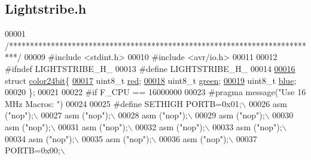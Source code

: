 \hypertarget{_lightstribe_8h_source}{}\subsection{Lightstribe.\+h}

\begin{DoxyCode}
00001 \textcolor{comment}{/**************************************************************************/}
00009 \textcolor{preprocessor}{#include <stdint.h>}
00010 \textcolor{preprocessor}{#include <avr/io.h>}
00011 
00012 \textcolor{preprocessor}{#ifndef LIGHTSTRIBE\_H\_}
00013 \textcolor{preprocessor}{#define LIGHTSTRIBE\_H\_}
00014 
\hypertarget{_lightstribe_8h_source_l00016}{}\hyperlink{structcolor24bit}{00016} \textcolor{keyword}{struct }\hyperlink{structcolor24bit}{color24bit}\{
\hypertarget{_lightstribe_8h_source_l00017}{}\hyperlink{structcolor24bit_ad47d918910aaa51c73160ac85999d09c}{00017}     uint8\_t \hyperlink{structcolor24bit_ad47d918910aaa51c73160ac85999d09c}{red};                                 
\hypertarget{_lightstribe_8h_source_l00018}{}\hyperlink{structcolor24bit_a90d21fa503b626c00cdc8d94863d5877}{00018}     uint8\_t \hyperlink{structcolor24bit_a90d21fa503b626c00cdc8d94863d5877}{green};                                 
\hypertarget{_lightstribe_8h_source_l00019}{}\hyperlink{structcolor24bit_a287b397e90d7b995c81ff54e741f96b2}{00019}     uint8\_t \hyperlink{structcolor24bit_a287b397e90d7b995c81ff54e741f96b2}{blue};                                   
00020 \};
00021 
00022 \textcolor{preprocessor}{#if F\_CPU == 16000000}
00023 \textcolor{preprocessor}{#pragma message("Use 16 MHz Macros: ")}
00024 
00025 \textcolor{preprocessor}{#define SETHIGH PORTB=0x01;\(\backslash\)}
00026 \textcolor{preprocessor}{               asm ("nop");\(\backslash\)}
00027 \textcolor{preprocessor}{               asm ("nop");\(\backslash\)}
00028 \textcolor{preprocessor}{               asm ("nop");\(\backslash\)}
00029 \textcolor{preprocessor}{               asm ("nop");\(\backslash\)}
00030 \textcolor{preprocessor}{               asm ("nop");\(\backslash\)}
00031 \textcolor{preprocessor}{               asm ("nop");\(\backslash\)}
00032 \textcolor{preprocessor}{               asm ("nop");\(\backslash\)}
00033 \textcolor{preprocessor}{               asm ("nop");\(\backslash\)}
00034 \textcolor{preprocessor}{               asm ("nop");\(\backslash\)}
00035 \textcolor{preprocessor}{               asm ("nop");\(\backslash\)}
00036 \textcolor{preprocessor}{               asm ("nop");\(\backslash\)}
00037 \textcolor{preprocessor}{               PORTB=0x00;\(\backslash\)}

\end{DoxyCode}
